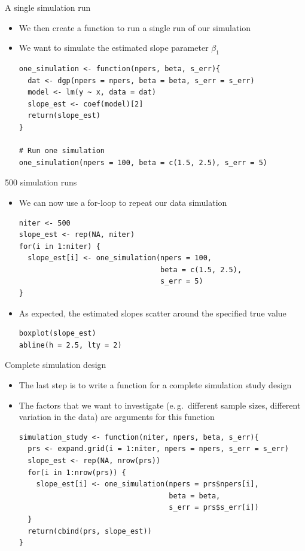 \documentclass[aspectratio=169]{beamer}
\begin{document}
\begin{frame}[fragile]{A single simulation run}
  \begin{itemize}
    \item We then create a function to run a single run of our simulation
    \item We want to simulate the estimated slope parameter $\beta_1$
\begin{lstlisting}
one_simulation <- function(npers, beta, s_err){
  dat <- dgp(npers = npers, beta = beta, s_err = s_err)
  model <- lm(y ~ x, data = dat)
  slope_est <- coef(model)[2]
  return(slope_est)
}

# Run one simulation
one_simulation(npers = 100, beta = c(1.5, 2.5), s_err = 5)
\end{lstlisting}
  \end{itemize}
\end{frame}

\begin{frame}[fragile]{500 simulation runs}
  \begin{itemize}
    \item We can now use a for-loop to repeat our data simulation
\begin{lstlisting}
niter <- 500
slope_est <- rep(NA, niter)
for(i in 1:niter) {
  slope_est[i] <- one_simulation(npers = 100, 
                                 beta = c(1.5, 2.5), 
                                 s_err = 5)
}
\end{lstlisting}
\item As expected, the estimated slopes scatter around the specified true value
\begin{lstlisting}
boxplot(slope_est)
abline(h = 2.5, lty = 2)
\end{lstlisting}
  \end{itemize}
\end{frame}

\begin{frame}[fragile]{Complete simulation design}
  \begin{itemize}
    \item The last step is to write a function for a complete simulation study
      design
    \item The factors that we want to investigate (e.\,g.\ different sample
      sizes, different variation in the data) are arguments for this function
\begin{lstlisting}
simulation_study <- function(niter, npers, beta, s_err){
  prs <- expand.grid(i = 1:niter, npers = npers, s_err = s_err)
  slope_est <- rep(NA, nrow(prs))
  for(i in 1:nrow(prs)) {
    slope_est[i] <- one_simulation(npers = prs$npers[i],
                                   beta = beta,
                                   s_err = prs$s_err[i])
  }
  return(cbind(prs, slope_est))
}
\end{lstlisting}
  \end{itemize}
\end{frame}
\end{document}
